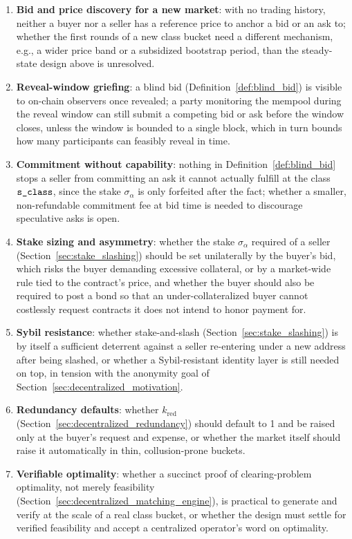 \begin{enumerate}
  \item \textbf{Bid and price discovery for a new market}: with no trading
    history, neither a buyer nor a seller has a reference price to anchor
    a bid or an ask to; whether the first rounds of a new class bucket need
    a different mechanism, e.g., a wider price band or a subsidized
    bootstrap period, than the steady-state design above is unresolved.

  \item \textbf{Reveal-window griefing}: a blind bid
    (Definition~\ref{def:blind_bid}) is visible to on-chain observers once
    revealed; a party monitoring the mempool during the reveal window can
    still submit a competing bid or ask before the window closes, unless
    the window is bounded to a single block, which in turn bounds how many
    participants can feasibly reveal in time.

  \item \textbf{Commitment without capability}: nothing in
    Definition~\ref{def:blind_bid} stops a seller from committing an ask
    it cannot actually fulfill at the class $\textnormal{\texttt{s\_class}}$, since the stake
    $\sigma_\alpha$ is only forfeited after the fact; whether a smaller,
    non-refundable commitment fee at bid time is needed to discourage
    speculative asks is open.

  \item \textbf{Stake sizing and asymmetry}: whether the stake
    $\sigma_\alpha$ required of a seller (Section~\ref{sec:stake_slashing})
    should be set unilaterally by the buyer's bid, which risks the buyer
    demanding excessive collateral, or by a market-wide rule tied to the
    contract's price, and whether the buyer should also be required to
    post a bond so that an under-collateralized buyer cannot costlessly
    request contracts it does not intend to honor payment for.

  \item \textbf{Sybil resistance}: whether stake-and-slash
    (Section~\ref{sec:stake_slashing}) is by itself a sufficient deterrent
    against a seller re-entering under a new address after being slashed,
    or whether a Sybil-resistant identity layer is still needed on top, in
    tension with the anonymity goal of Section~\ref{sec:decentralized_motivation}.

  \item \textbf{Redundancy defaults}: whether $k_{\text{red}}$
    (Section~\ref{sec:decentralized_redundancy}) should default to 1 and
    be raised only at the buyer's request and expense, or whether the
    market itself should raise it automatically in thin, collusion-prone
    buckets.

  \item \textbf{Verifiable optimality}: whether a succinct proof of
    clearing-problem optimality, not merely feasibility
    (Section~\ref{sec:decentralized_matching_engine}), is practical to
    generate and verify at the scale of a real class bucket, or whether the
    design must settle for verified feasibility and accept a centralized
    operator's word on optimality.
\end{enumerate}
